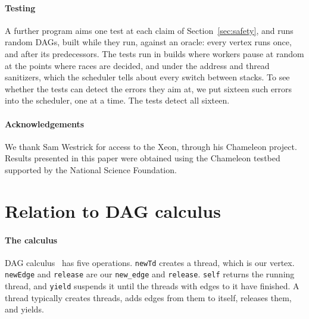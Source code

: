 \documentclass[sigplan,nonacm]{acmart}
\begin{document}
\paragraph{Testing}
%
A further program aims one test at each claim of
Section~\ref{sec:safety}, and runs random DAGs, built while they run,
against an oracle: every vertex runs once, and after its
predecessors.
%
The tests run in builds where workers pause at random at the points
where races are decided, and under the address and thread sanitizers,
which the scheduler tells about every switch between stacks.
%
To see whether the tests can detect the errors they aim at, we put
sixteen such errors into the scheduler, one at a time.
%
The tests detect all sixteen.

\paragraph{Acknowledgements}
%
We thank Sam Westrick for access to the Xeon, through his Chameleon
project.
%
Results presented in this paper were obtained using the Chameleon
testbed~\cite{keahey2020lessons} supported by the National Science
Foundation.




\clearpage
\appendix

\section{Relation to DAG calculus}
\label{sec:calculus}

\paragraph{The calculus}
%
DAG calculus~\cite{Dag_calculus_16} has five operations.
%
\lstinline|newTd| creates a thread, which is our vertex.
%
\lstinline|newEdge| and \lstinline|release| are our
\lstinline|new_edge| and \lstinline|release|.
%
\lstinline|self| returns the running thread, and \lstinline|yield|
suspends it until the threads with edges to it have finished.
%
A thread typically creates threads, adds edges from them to itself,
releases them, and yields.
\end{document}
